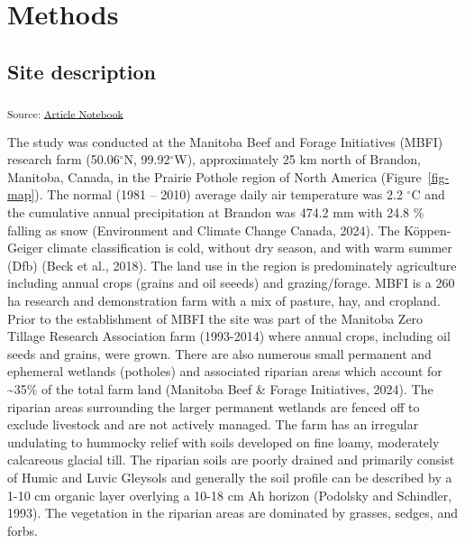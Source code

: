\documentclass[
]{agujournal2019}
\begin{document}
\section{Methods}\label{methods}

\subsection{Site description}\label{site-description}

\textsubscript{Source:
\href{https://alex-koiter.github.io/riparian-grazing-manuscript/index.qmd.html}{Article
Notebook}}

The study was conducted at the Manitoba Beef and Forage Initiatives
(MBFI) research farm (50.06\(^\circ\)N, 99.92\(^\circ\)W), approximately
25 km north of Brandon, Manitoba, Canada, in the Prairie Pothole region
of North America (Figure~\ref{fig-map}). The normal (1981 -- 2010)
average daily air temperature was 2.2 \(^\circ\)C and the cumulative
annual precipitation at Brandon was 474.2 mm with 24.8 \% falling as
snow (Environment and Climate Change Canada, 2024). The Köppen-Geiger
climate classification is cold, without dry season, and with warm summer
(Dfb) (Beck et al., 2018). The land use in the region is predominately
agriculture including annual crops (grains and oil seeeds) and
grazing/forage. MBFI is a 260 ha research and demonstration farm with a
mix of pasture, hay, and cropland. Prior to the establishment of MBFI
the site was part of the Manitoba Zero Tillage Research Association farm
(1993-2014) where annual crops, including oil seeds and grains, were
grown. There are also numerous small permanent and ephemeral wetlands
(potholes) and associated riparian areas which account for
\textasciitilde35\% of the total farm land (Manitoba Beef \& Forage
Initiatives, 2024). The riparian areas surrounding the larger permanent
wetlands are fenced off to exclude livestock and are not actively
managed. The farm has an irregular undulating to hummocky relief with
soils developed on fine loamy, moderately calcareous glacial till. The
riparian soils are poorly drained and primarily consist of Humic and
Luvic Gleysols and generally the soil profile can be described by a 1-10
cm organic layer overlying a 10-18 cm Ah horizon (Podolsky and
Schindler, 1993). The vegetation in the riparian areas are dominated by
grasses, sedges, and forbs.
\end{document}
